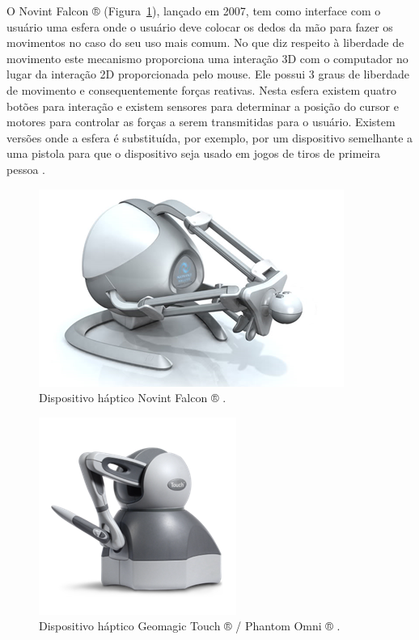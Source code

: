 O Novint Falcon ® (Figura~\ref{fig:hapticoNovintFalcon}), lançado em 2007, tem como interface com o usuário uma esfera onde o usuário deve colocar os dedos da mão para fazer os movimentos no caso do seu uso mais comum. No que diz respeito à liberdade de movimento este mecanismo proporciona uma interação 3D com o computador no lugar da interação 2D proporcionada pelo mouse. Ele possui 3 graus de liberdade de movimento e consequentemente forças reativas. Nesta esfera existem quatro botões para interação e existem sensores para determinar a posição do cursor e motores para controlar as forças a serem transmitidas para o usuário. Existem versões onde a esfera é substituída, por exemplo, por um dispositivo semelhante a uma pistola para que o dispositivo seja usado em jogos de tiros de primeira pessoa \cite{VRS2017}. 

\begin{figure}[ht!]
    \centering
    \includegraphics[width=0.4\linewidth]{capitulos/figuras/hapticoNovintFalcon.png}
    \caption{Dispositivo háptico Novint Falcon ® \cite{HAPTICSHOUSE2019}
    \label{fig:hapticoNovintFalcon}.}
\end{figure}

\begin{figure}[ht!]
    \centering
    \includegraphics[width=0.4\linewidth]{capitulos/figuras/hapticoTouch.png}
    \caption{Dispositivo háptico Geomagic Touch ® / Phantom Omni ® \cite{3DSystems2018}.}
    \label{fig:hapticoTouch}
\end{figure}

